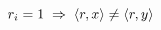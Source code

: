 \documentclass[preview]{standalone}
\begin{document}
\begin{center}
$r_i=1 \hspace{0.1cm}\Rightarrow\hspace{0.1cm} \langle r, x\rangle \neq \langle r,y \rangle $
\end{center}
\end{document}
